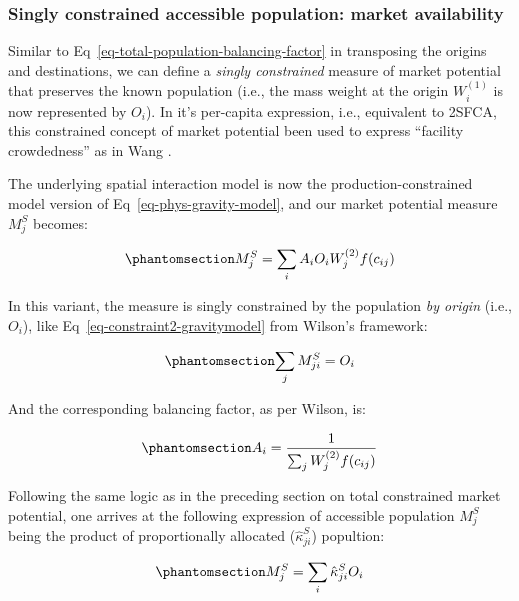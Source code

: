 \documentclass[
  10pt,
  letterpaper,
]{article}
\begin{document}
\subsubsection{Singly constrained accessible population: market
availability}\label{singly-constrained-accessible-population-market-availability}

Similar to Eq~\ref{eq-total-population-balancing-factor} in transposing
the origins and destinations, we can define a \emph{singly constrained}
measure of market potential that preserves the known population (i.e.,
the mass weight at the origin \(W_i^{(1)}\) is now represented by
\(O_i\)). In it's per-capita expression, i.e., equivalent to 2SFCA, this
constrained concept of market potential been used to express ``facility
crowdedness'' as in Wang \citep{wang_inverted_2018}.

The underlying spatial interaction model is now the
production-constrained model version of Eq~\ref{eq-phys-gravity-model},
and our market potential measure \(M^S_j\) becomes:

\begin{equation}\phantomsection\label{eq-population-constrained-accessibility}{
M^S_j = \sum_i A_i O_i W_j^{(2)} f(c_{ij})
}\end{equation}

In this variant, the measure is singly constrained by the population
\emph{by origin} (i.e., \(O_i\)), like
Eq~\ref{eq-constraint2-gravitymodel} from Wilson's framework:

\begin{equation}\phantomsection\label{eq-population-constraint}{
\sum_j M^S_{ji} =  O_i 
}\end{equation}

And the corresponding balancing factor, as per Wilson, is:

\begin{equation}\phantomsection\label{eq-population-constrained-proportionality-constants}{
A_i = \frac{1}{\sum_j W_j^{(2)} f(c_{ij})}
}\end{equation}

Following the same logic as in the preceding section on total
constrained market potential, one arrives at the following expression of
accessible population \(M_j^S\) being the product of proportionally
allocated (\(\hat \kappa^S_{ji}\)) popultion:

\begin{equation}\phantomsection\label{eq-production-constrained-accessibility-with-proportional-allocation-factor}{
M^S_{j} = \sum_i \hat \kappa^S_{ji} O_i
}\end{equation}
\end{document}
